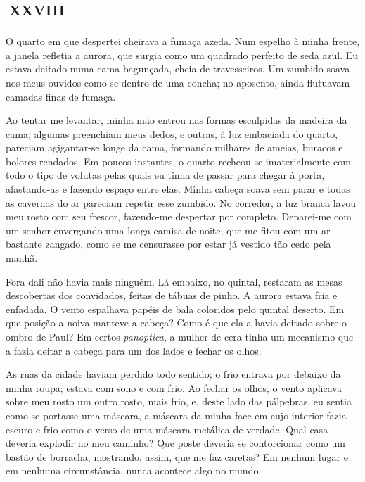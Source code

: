 \chapter*{\small{}\,\Large\centering\textsc{xxviii}\,\small{}}

O quarto em que despertei cheirava a fumaça azeda. Num espelho à minha frente, a janela refletia a aurora, que surgia como um quadrado perfeito de seda azul. Eu estava deitado numa cama bagunçada, cheia de travesseiros. Um zumbido soava nos meus ouvidos como se dentro de uma concha; no aposento, ainda flutuavam camadas finas de fumaça.

Ao tentar me levantar, minha mão entrou nas formas esculpidas da madeira da cama; algumas preenchiam meus dedos, e outras, à luz embaciada do quarto, pareciam agigantar-se longe da cama, formando milhares de ameias, buracos e bolores rendados. Em poucos instantes, o quarto recheou-se imaterialmente com todo o tipo de volutas pelas quais eu tinha de passar para chegar à porta, afastando-as e fazendo espaço entre elas. Minha cabeça soava sem parar e todas as cavernas do ar pareciam repetir esse zumbido. No corredor, a luz branca lavou meu rosto com seu frescor, fazendo-me despertar por completo. Deparei-me com um senhor envergando uma longa camisa de noite, que me fitou com um ar bastante zangado, como se me censurasse por estar já vestido tão cedo pela manhã.

Fora dali não havia mais ninguém. Lá embaixo, no quintal, restaram as mesas descobertas dos convidados, feitas de tábuas de pinho. A aurora estava fria e enfadada. O vento espalhava papéis de bala coloridos pelo quintal deserto. Em que posição a noiva manteve a cabeça? Como é que ela a havia deitado sobre o ombro de Paul? Em certos \textit{panoptica}, a mulher de cera tinha um mecanismo que a fazia deitar a cabeça para um dos lados e fechar os olhos.

As ruas da cidade haviam perdido todo sentido; o frio entrava por debaixo da minha roupa; estava com sono e com frio. Ao fechar os olhos, o vento aplicava sobre meu rosto um outro rosto, mais frio, e, deste lado das pálpebras, eu sentia como se portasse uma máscara, a máscara da minha face em cujo interior fazia escuro e frio como o verso de uma máscara metálica de verdade. Qual casa deveria explodir no meu caminho? Que poste deveria se contorcionar como um bastão de borracha, mostrando, assim, que me faz caretas? Em nenhum lugar e em nenhuma circunstância, nunca acontece algo no mundo.


